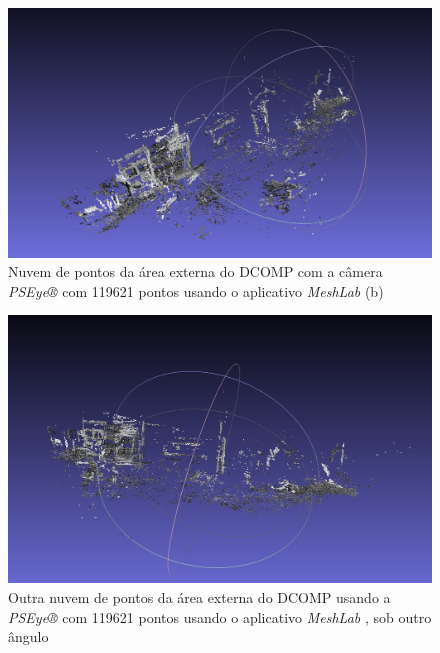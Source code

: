 \begin{figure}[H]
	\centering
		\includegraphics[width= \textwidth]{Imagens/figura4-6.jpg}
	\caption{Nuvem de pontos da área externa do DCOMP com a câmera \textit{PSEye®} com 119621 pontos usando o aplicativo \textit{MeshLab} (b)}
	\label{fig4:6}
\end{figure}


\begin{figure}[H]
	\centering
		\includegraphics[width= \textwidth]{Imagens/figura4-8.jpg}
	\caption{Outra nuvem de pontos da área externa do DCOMP usando a \textit{PSEye®} com 119621 pontos usando o aplicativo \textit{MeshLab} , sob outro ângulo}
	\label{fig4:8}
\end{figure}

